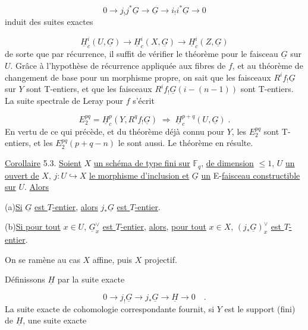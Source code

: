 \begin{equation*}
0 \longrightarrow j_! j^* \underline{G} \longrightarrow \underline{G} \longrightarrow i_! i^* \underline{G} \longrightarrow 0
\end{equation*}
induit des suites exactes

\begin{equation*}
\underline{H}^i_c(U,\underline{G}) \longrightarrow \underline{H}^i_c(X,\underline{G}) \longrightarrow \underline{H}^i_c(Z,\underline{G})
\end{equation*}
de sorte que par récurrence, il suffit de vérifier le théorème pour le faisceau $\underline{G}$ sur $U$. Grâce à l'hypothèse de récurrence appliquée aux fibres de $f$, et au théorème de changement de base pour un morphisme propre, on sait que les faisceaux $R^i f_! \underline{G}$ sur $Y$ sont T-entiers, et que les faisceaux $R^i f_! \underline{G}(i-(n-1))$ sont T-entiers. La suite spectrale de Leray pour $f$ s'écrit

\begin{equation*}
E_2^{pq} = \underline{H}^p_c(Y,R^q f_! \underline{G}) \;\Longrightarrow\; \underline{H}^{p+q}_c(U,\underline{G}) \;.
\end{equation*}
En vertu de ce qui précède, et du théorème déjà connu pour $Y$, les $E_2^{pq}$ sont T-entiers, et les $E_2^{pq}(p+q-n)$ le sont aussi. Le théorème en résulte.

\underline{Corollaire} 5.3. \underline{Soient} $X$ \underline{un schéma de type fini sur} $\mathbb{F}_q$, \underline{de dimension} $\leq 1$, $U$ \underline{un ouvert de} $X$, $j : U \hookrightarrow X$ \underline{le morphisme d'inclusion et} $\underline{G}$ \underline{un} E-\underline{faisceau constructible sur} $U$. \underline{Alors} 



(a)\quad \underline{Si} $\underline{G}$ \underline{est $T$-entier}, \underline{alors} $j_*\underline{G}$ \underline{est $T$-entier}.

(b)\quad \underline{Si pour tout} $x \in U$, $\underline{G}^\vee_x$ \underline{est $T$-entier}, \underline{alors}, \underline{pour tout} $x \in X$, $(j_*\underline{G})_x^\vee$ \underline{est $T$-entier}.

On se ramène au cas $X$ affine, puis $X$ projectif.

Définissons $\underline{H}$ par la suite exacte

\begin{equation*}
0 \longrightarrow j_!\underline{G} \longrightarrow j_*\underline{G} \longrightarrow \underline{H} \longrightarrow 0 \quad .
\end{equation*}
La suite exacte de cohomologie correspondante fournit, si $Y$ est le support (fini) de $\underline{H}$, une suite exacte

